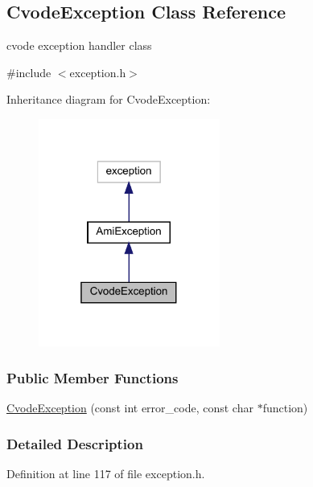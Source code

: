 \hypertarget{classamici_1_1_cvode_exception}{}\subsection{Cvode\+Exception Class Reference}
\label{classamici_1_1_cvode_exception}


cvode exception handler class  




{\ttfamily \#include $<$exception.\+h$>$}



Inheritance diagram for Cvode\+Exception\+:
\nopagebreak
\begin{figure}[H]
\begin{center}
\leavevmode
\includegraphics[width=169pt]{classamici_1_1_cvode_exception__inherit__graph}
\end{center}
\end{figure}
\subsubsection*{Public Member Functions}
\begin{DoxyCompactItemize}
\item 
\mbox{\hyperlink{classamici_1_1_cvode_exception_ac93a5dc0529238779b716b7a30cf69cb}{Cvode\+Exception}} (const int error\+\_\+code, const char $\ast$function)
\end{DoxyCompactItemize}


\subsubsection{Detailed Description}


Definition at line 117 of file exception.\+h.



